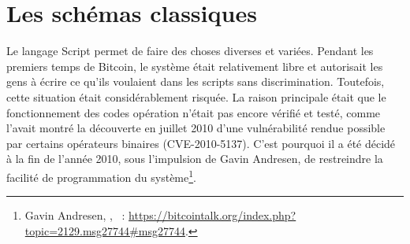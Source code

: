 %
%
%
%
%
%
%


\section*{Les schémas classiques}


Le langage Script permet de faire des choses diverses et variées. Pendant les premiers temps de Bitcoin, le système était relativement libre et autorisait les gens à écrire ce qu'ils voulaient dans les scripts sans discrimination. Toutefois, cette situation était considérablement risquée. La raison principale était que le fonctionnement des codes opération n'était pas encore vérifié et testé, comme l'avait montré la découverte en juillet 2010 d'une vulnérabilité rendue possible par certains opérateurs binaires (CVE-2010-5137). C'est pourquoi il a été décidé à la fin de l'année 2010, sous l'impulsion de Gavin Andresen, de restreindre la facilité de programmation du système\footnote{Gavin Andresen, , ~: \url{https://bitcointalk.org/index.php?topic=2129.msg27744\#msg27744}.}.

